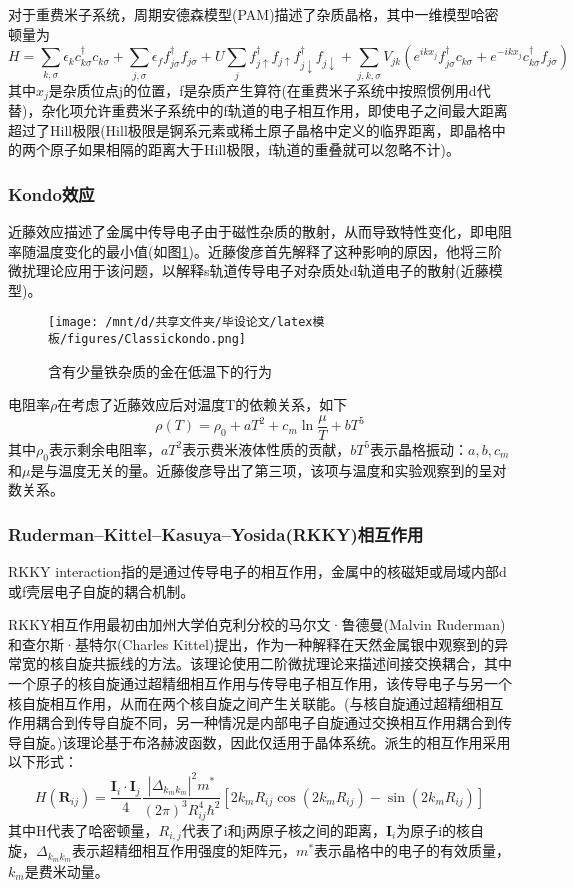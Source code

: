 对于重费米子系统，周期安德森模型(PAM)描述了杂质晶格，其中一维模型哈密顿量为
$$
H=\sum_{k, \sigma} \epsilon_{k} c_{k \sigma}^{\dagger} c_{k \sigma}+\sum_{j, \sigma} \epsilon_{f} f_{j \sigma}^{\dagger} f_{j \sigma}+U \sum_{j} f_{j \uparrow}^{\dagger} f_{j \uparrow} f_{j \downarrow}^{\dagger} f_{j \downarrow}+\sum_{j, k, \sigma} V_{j k}\left(e^{i k x_{j}} f_{j \sigma}^{\dagger} c_{k \sigma}+e^{-i k x_{j}} c_{k \sigma}^{\dagger} f_{j \sigma}\right)
$$
其中$x_j$是杂质位点j的位置，f是杂质产生算符(在重费米子系统中按照惯例用d代替)，杂化项允许重费米子系统中的f轨道的电子相互作用，即使电子之间最大距离超过了Hill极限(Hill极限是锕系元素或稀土原子晶格中定义的临界距离，即晶格中的两个原子如果相隔的距离大于Hill极限，f轨道的重叠就可以忽略不计)。%

\subsubsection{Kondo效应}
近藤效应描述了金属中传导电子由于磁性杂质的散射，从而导致特性变化，即电阻率随温度变化的最小值(如图\ref{fig})。近藤俊彦首先解释了这种影响的原因\cite{3}，他将三阶微扰理论应用于该问题，以解释s轨道传导电子对杂质处d轨道电子的散射(近藤模型)。
\begin{figure}[h]
    \centering
    \texttt{[image: /mnt/d/共享文件夹/毕设论文/latex模板/figures/Classickondo.png]}
    \caption{含有少量铁杂质的金在低温下的行为\cite{4}}
    \label{fig}
\end{figure}
电阻率$\rho$在考虑了近藤效应后对温度T的依赖关系，如下
$$
\rho(T)=\rho_{0}+a T^{2}+c_{m} \ln \frac{\mu}{T}+b T^{5}
$$
其中$\rho_0$表示剩余电阻率，$aT^2$表示费米液体性质的贡献，$bT^5$表示晶格振动：$a,b,c_m$和$\mu$是与温度无关的量。近藤俊彦导出了第三项，该项与温度和实验观察到的呈对数关系。


\subsubsection{Ruderman–Kittel–Kasuya–Yosida(RKKY)相互作用}
RKKY interaction指的是通过传导电子的相互作用，金属中的核磁矩或局域内部d或f壳层电子自旋的耦合机制\cite{5}\cite{6}\cite{7}。

RKKY相互作用最初由加州大学伯克利分校的马尔文·鲁德曼(Malvin Ruderman)和查尔斯·基特尔(Charles Kittel)提出，作为一种解释在天然金属银中观察到的异常宽的核自旋共振线的方法。该理论使用二阶微扰理论来描述间接交换耦合，其中一个原子的核自旋通过超精细相互作用与传导电子相互作用，该传导电子与另一个核自旋相互作用，从而在两个核自旋之间产生关联能。(与核自旋通过超精细相互作用耦合到传导自旋不同，另一种情况是内部电子自旋通过交换相互作用耦合到传导自旋。)该理论基于布洛赫波函数，因此仅适用于晶体系统。派生的相互作用采用以下形式：
$$
H\left(\mathbf{R}_{i j}\right)=\frac{\mathbf{I}_{i} \cdot \mathbf{I}_{j}}{4} \frac{\left|\Delta_{k_{m} k_{m}}\right|^{2} m^{*}}{(2 \pi)^{3} R_{i j}^{4} \hbar^2}\left[2 k_{m} R_{i j} \cos \left(2 k_{m} R_{i j}\right)-\sin \left(2 k_{m} R_{i j}\right)\right]
$$
其中H代表了哈密顿量，$R_{i,j}$代表了i和j两原子核之间的距离，$\mathbf{I}_i$为原子i的核自旋，$\Delta_{k_{m}k_m}$表示超精细相互作用强度的矩阵元，$m^*$表示晶格中的电子的有效质量，$k_m$是费米动量。 







